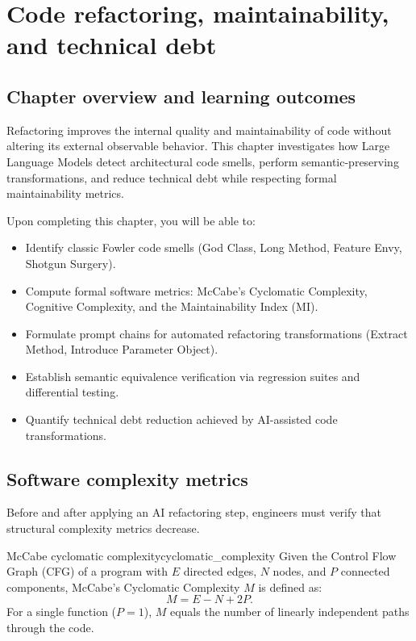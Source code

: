 \documentclass[../../main.tex]{subfiles}
\begin{document}
\chapter{Code refactoring, maintainability, and technical debt}
\label{ch:code_refactoring_maintainability}

\section{Chapter overview and learning outcomes}
Refactoring improves the internal quality and maintainability of code without altering its external observable behavior. This chapter investigates how Large Language Models detect architectural code smells, perform semantic-preserving transformations, and reduce technical debt while respecting formal maintainability metrics.

Upon completing this chapter, you will be able to:
\begin{itemize}
    \item Identify classic Fowler code smells (God Class, Long Method, Feature Envy, Shotgun Surgery).
    \item Compute formal software metrics: McCabe's Cyclomatic Complexity, Cognitive Complexity, and the Maintainability Index (MI).
    \item Formulate prompt chains for automated refactoring transformations (Extract Method, Introduce Parameter Object).
    \item Establish semantic equivalence verification via regression suites and differential testing.
    \item Quantify technical debt reduction achieved by AI-assisted code transformations.
\end{itemize}

\section{Software complexity metrics}
Before and after applying an AI refactoring step, engineers must verify that structural complexity metrics decrease.

\begin{definition}{McCabe cyclomatic complexity}{cyclomatic_complexity}
Given the Control Flow Graph (CFG) of a program with $E$ directed edges, $N$ nodes, and $P$ connected components, McCabe's Cyclomatic Complexity $M$ is defined as:
\begin{equation}
\label{eq:cyclomatic}
M = E - N + 2 P.
\end{equation}
For a single function ($P=1$), $M$ equals the number of linearly independent paths through the code.
\end{definition}
\end{document}

